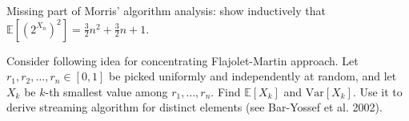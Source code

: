 \documentclass[12pt]{uebung}
\begin{document}
\newpage

\begin{aufg}
Missing part of Morris' algorithm analysis: show inductively that $\mathbb{E}\left[\left(2^{X_n}\right)^2\right] = \frac{3}{2}n^2 + \frac{3}{2} n + 1$.
\end{aufg}

\begin{aufg}[2 pts]
Consider following idea for concentrating Flajolet-Martin approach. Let $r_1,r_2,\ldots,r_n \in [0,1]$ be picked uniformly and independently at random, and let $X_k$ be $k$-th smallest value among $r_1,\ldots,r_n$. Find $\mathbb{E}[X_k]$ and $\mathrm{Var}[X_k]$. Use it to derive streaming algorithm for distinct elements (see Bar-Yossef et al. 2002).
\end{aufg}
\end{document}
